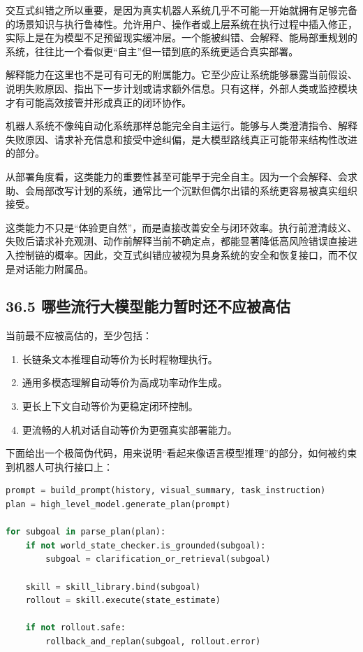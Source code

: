 交互式纠错之所以重要，是因为真实机器人系统几乎不可能一开始就拥有足够完备的场景知识与执行鲁棒性。允许用户、操作者或上层系统在执行过程中插入修正，实际上是在为模型不足预留现实缓冲层。一个能被纠错、会解释、能局部重规划的系统，往往比一个看似更“自主”但一错到底的系统更适合真实部署。

解释能力在这里也不是可有可无的附属能力。它至少应让系统能够暴露当前假设、说明失败原因、指出下一步计划或请求额外信息。只有这样，外部人类或监控模块才有可能高效接管并形成真正的闭环协作。

机器人系统不像纯自动化系统那样总能完全自主运行。能够与人类澄清指令、解释失败原因、请求补充信息和接受中途纠偏，是大模型路线真正可能带来结构性改进的部分。

从部署角度看，这类能力的重要性甚至可能早于完全自主。因为一个会解释、会求助、会局部改写计划的系统，通常比一个沉默但偶尔出错的系统更容易被真实组织接受。

这类能力不只是“体验更自然”，而是直接改善安全与闭环效率。执行前澄清歧义、失败后请求补充观测、动作前解释当前不确定点，都能显著降低高风险错误直接进入控制链的概率。因此，交互式纠错应被视为具身系统的安全和恢复接口，而不仅是对话能力附属品。

\subsection*{36.5 哪些流行大模型能力暂时还不应被高估}


当前最不应被高估的，至少包括：

\begin{enumerate}
\item 长链条文本推理自动等价为长时程物理执行。
\item 通用多模态理解自动等价为高成功率动作生成。
\item 更长上下文自动等价为更稳定闭环控制。
\item 更流畅的人机对话自动等价为更强真实部署能力。
\end{enumerate}

下面给出一个极简伪代码，用来说明“看起来像语言模型推理”的部分，如何被约束到机器人可执行接口上：

\begin{lstlisting}[language=python]
prompt = build_prompt(history, visual_summary, task_instruction)
plan = high_level_model.generate_plan(prompt)

for subgoal in parse_plan(plan):
    if not world_state_checker.is_grounded(subgoal):
        subgoal = clarification_or_retrieval(subgoal)

    skill = skill_library.bind(subgoal)
    rollout = skill.execute(state_estimate)

    if not rollout.safe:
        rollback_and_replan(subgoal, rollout.error)
\end{lstlisting}

